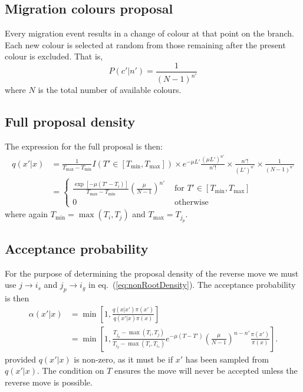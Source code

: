 \documentclass[a4paper,11pt]{article}
\begin{document}
\subsection{Migration colours proposal}

Every migration event results in a change of colour at that point on
the branch.  Each new colour is selected at random from those
remaining after the present colour is excluded. That is,
\begin{equation}
  P(c'|n') = \frac{1}{(N-1)^{n'}}
\end{equation}
where $N$ is the total number of available colours.

\subsection{Full proposal density}

The expression for the full proposal is then:
\begin{align}
  q(x'|x) &=\frac{1}{T_{\max}-T_{\min}}I(T'\in[T_{\min},T_{\max}])
  \times e^{-\mu L'}\frac{(\mu L')^{n'}}{n'!}
  \times \frac{n'!}{(L')^{n'}}
  \times \frac{1}{(N-1)^{n'}}\nonumber\\
&=\left\{\begin{array}{rl}
    \frac{\exp[-\mu(T'-T_i)]}{T_{\max}-T_{\min}}\left(\frac{\mu}{N-1}\right)^{n'} &
    \text{ for }T'\in[T_{\min},T_{\max}]\\
    0 & \text{ otherwise}
    \end{array}\right.
\label{eq:nonRootDensity}
\end{align}
where again $T_{\min}=\max(T_i,T_j)$ and $T_{\max}=T_{j_p}$.

\subsection{Acceptance probability}

For the purpose of determining the proposal density of the reverse
move we must use $j\rightarrow i_s$ and $j_p\rightarrow i_g$ in
eq.~(\ref{eq:nonRootDensity}). The acceptance probability is then
\begin{align}
  \alpha(x'|x) &=
  \min\left[1,\frac{q(x|x')\pi(x')}{q(x'|x)\pi(x)}\right]\nonumber\\
&=\min\left[1,\frac{T_{j_p}-\max(T_i,T_j)}{T_{i_g}-\max(T_i,T_{i_s})}e^{-\mu(T-T')}\left(\frac{\mu}{N-1}\right)^{n-n'}\frac{\pi(x')}{\pi(x)}\right].
\end{align}
provided $q(x'|x)$ is non-zero, as it must be if $x'$ has been sampled
from $q(x'|x)$.  The condition on $T$ ensures the move will never be
accepted unless the reverse move is possible.
\end{document}
